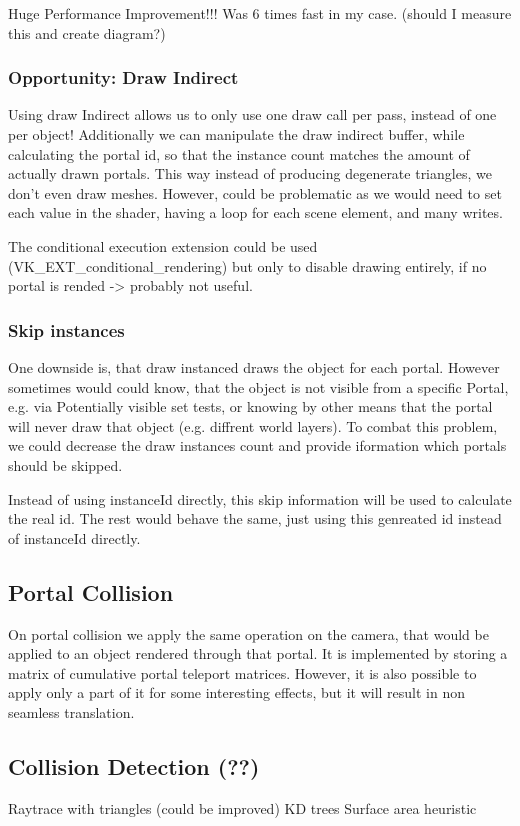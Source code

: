 Huge Performance Improvement!!! Was 6 times fast in my case. 
(should I measure this and create diagram?)

\subsubsection{Opportunity: Draw Indirect}
Using draw Indirect allows us to only use one draw call per pass, instead of one per object!
Additionally we can manipulate the draw indirect buffer, while calculating the portal id, so that the instance count matches the amount of actually drawn portals.
This way instead of producing degenerate triangles, we don't even draw meshes.
However, could be problematic as we would need to set each value in the shader, having a loop for each scene element, and many writes.

The conditional execution extension could be used (VK\_EXT\_conditional\_rendering) but only to disable drawing entirely, if no portal is rended -> probably not useful.

\subsubsection{Skip instances}
One downside is, that draw instanced draws the object for each portal. However sometimes would could know, that the object is not visible from a specific Portal, e.g. via Potentially visible set tests, or knowing by other means that the portal will never draw that object (e.g. diffrent world layers).
To combat this problem, we could decrease the draw instances count and provide iformation which portals should be skipped.

Instead of using instanceId directly, this skip information will be used to calculate the real id. The rest would behave the same, just using this genreated id instead of instanceId directly.


\subsection{Portal Collision}
On portal collision we apply the same operation on the camera, that would be applied to an object rendered through that portal.
It is implemented by storing a matrix of cumulative portal teleport matrices.
However, it is also possible to apply only a part of it for some interesting effects, but it will result in non seamless translation.

\subsection{Collision Detection (??)}
Raytrace with triangles (could be improved)
KD trees
Surface area heuristic

